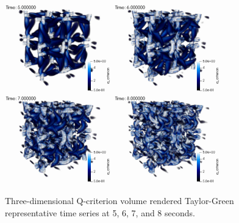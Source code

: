 \documentclass{article}
\begin{document}
\begin{figure}[!htbp]
  \centering
  {
   \includegraphics[height=1.5in]{images/tg_5s.png}
  }
  {
   \includegraphics[height=1.5in]{images/tg_6s.png}
  } \\
  {
   \includegraphics[height=1.5in]{images/tg_7s.png}
  }
  {
   \includegraphics[height=1.5in]{images/tg_8s.png}
  }
  \caption{Three-dimensional Q-criterion volume rendered Taylor-Green representative time series at 5, 6, 7, and 8 seconds.}
  \label{fig:q}
\end{figure}
\end{document}
